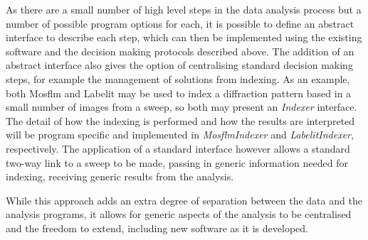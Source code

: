\documentclass[preprint,pdf]{iucr}
\begin{document}
As there are a small number of high level steps in the data analysis
process but a number of possible program options for each, it is
possible to define an abstract interface to describe each step, which
can then be implemented using the existing software 
and the decision making protocols described above. The addition of an
abstract interface also gives the option of centralising standard
decision making steps, for example the management of solutions from
indexing. As an example, both Mosflm and Labelit may be used to index
a diffraction pattern based in a small number of images from a sweep,
so both may present an \emph{Indexer} interface. The detail of how the
indexing is performed and how the results are interpreted will be
program specific and implemented in \emph{MosflmIndexer} and
\emph{LabelitIndexer}, respectively. The application of a standard
interface however allows a standard two-way link to a sweep to be
made, passing in generic information needed for indexing, receiving
generic results from the analysis.

While this approach adds an extra degree of separation between the
data and the analysis programs, it allows for generic aspects of the
analysis to be centralised and the freedom to extend, including
new software as it is developed. 
\end{document}
